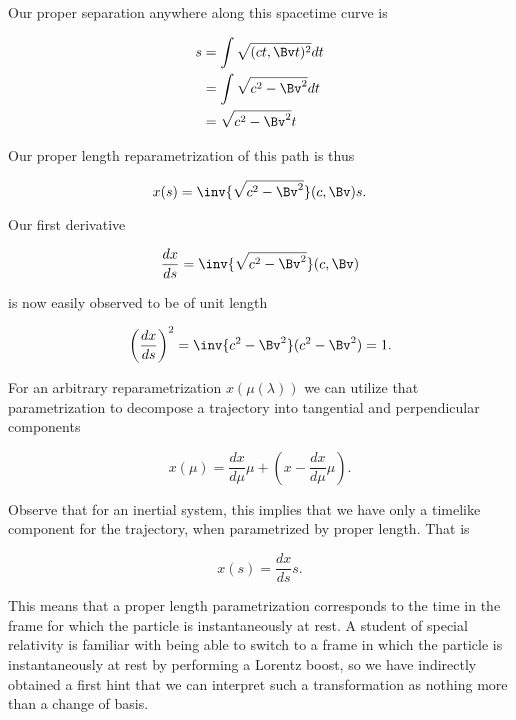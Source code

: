 Our proper separation anywhere along this spacetime curve is

\begin{equation}\label{eqn:grahamSchmidtLorentz:460}
\begin{aligned}
s
&= \int \sqrt{(c t, \Bv t)^2} dt  \\
&= \int \sqrt{ c^2 - \Bv^2 } dt  \\
&= \sqrt{ c^2 - \Bv^2 } t
\end{aligned}
\end{equation}

Our proper length reparametrization of this path is thus

\begin{equation}\label{eqn:grahamSchmidtLorentz:480}
x(s) = \inv{\sqrt{c^2 - \Bv^2}} (c, \Bv) s.
\end{equation}

Our first derivative

\begin{equation}\label{eqn:grahamSchmidtLorentz:500}
\frac{dx}{ds} = \inv{\sqrt{c^2 - \Bv^2}} (c, \Bv)
\end{equation}

is now easily observed to be of unit length

\begin{equation}\label{eqn:grahamSchmidtLorentz:520}
\left( \frac{dx}{ds} \right)^2 = \inv{c^2 - \Bv^2} (c^2 - \Bv^2) = 1.
\end{equation}

For an arbitrary reparametrization $x(\mu(\lambda))$ we can utilize that parametrization to decompose a trajectory into tangential and perpendicular components

\begin{equation}\label{eqn:grahamSchmidtLorentz:540}
x(\mu) = \frac{dx}{d\mu} \mu + \left( x - \frac{dx}{d\mu} \mu \right).
\end{equation}

Observe that for an inertial system, this implies that we have only a timelike component for the trajectory, when parametrized by proper length.  That is

\begin{equation}\label{eqn:grahamSchmidtLorentz:580}
x(s) = \frac{dx}{ds} s.
\end{equation}

This means that a proper length parametrization corresponds to the time in the frame for which the particle is instantaneously at rest.  A student of special relativity is familiar with being able to switch to a frame in which the particle is instantaneously at rest by performing a Lorentz boost, so we have indirectly obtained a first hint that we can interpret such a transformation as nothing more than a change of basis.

